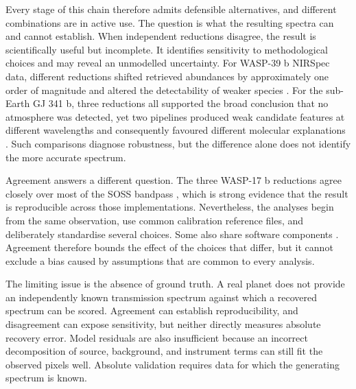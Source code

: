 Every stage of this chain therefore admits defensible alternatives, and
different combinations are in active use. The question is what the resulting
spectra can and cannot establish. When independent reductions disagree, the
result is scientifically useful but incomplete. It identifies sensitivity to
methodological choices and may reveal an unmodelled uncertainty. For WASP-39 b
NIRSpec data, different reductions shifted retrieved abundances by
approximately one order of magnitude and altered the detectability of weaker
species \citep{ConstantinouEtAl2023}. For the sub-Earth
GJ 341 b, three reductions all supported the broad conclusion that no atmosphere
was detected, yet two pipelines produced weak candidate features at different
wavelengths and consequently favoured different molecular explanations
\citep{KirkEtAl2024}. Such comparisons diagnose robustness, but the difference
alone does not identify the more accurate spectrum.


Agreement answers a different question. The three WASP-17 b reductions agree
closely over most of the SOSS bandpass \citep{LouieEtAl2025}, which is strong
evidence that the result is reproducible across those implementations.
Nevertheless, the analyses begin from the same observation, use common
calibration reference files, and deliberately standardise several choices.
Some also share software components
\citep{BellEtAl2022,RadicaEtAl2023,LouieEtAl2025}. Agreement therefore bounds the effect of
the choices that differ, but it cannot exclude a bias caused by assumptions that
are common to every analysis.


The limiting issue is the absence of ground truth. A real planet does not
provide an independently known transmission spectrum against which a recovered
spectrum can be scored. Agreement can establish reproducibility, and
disagreement can expose sensitivity, but neither directly measures absolute
recovery error. Model residuals are also insufficient because an incorrect
decomposition of source, background, and instrument terms can still fit the
observed pixels well. Absolute validation requires data for which the generating
spectrum is known.

